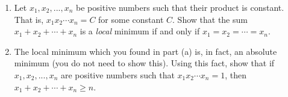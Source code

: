 \documentclass{ximera}
\begin{document}
\begin{problem} \begin{enumerate}
\item Let $x_1,x_2,...,x_n$ be positive numbers such that their product is constant. That is, $x_1x_2\cdots x_n=C$ for some constant $C$. Show that the sum $x_1+x_2+\cdots+x_n$ is a \emph{local} minimum if and only if $x_1=x_2=\cdots =x_n$.
\item The local minimum which you found in part (a) is, in fact, an absolute minimum (you do not need to show this). Using this fact, show that if $x_1,x_2,...,x_n$ are positive numbers such that $x_1x_2\cdots x_n=1$, then $x_1+x_2+\cdots+x_n\geq n$.
\end{enumerate}
\end{problem}
\end{document}
